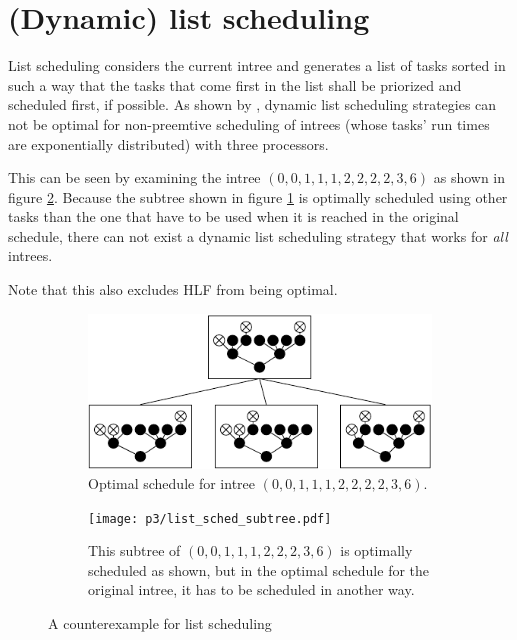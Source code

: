 \section{(Dynamic) list scheduling}
\label{sec:suboptimal-strategies-list-scheduling}

List scheduling considers the current intree and generates a list of tasks sorted in such a way that the tasks that come first in the list shall be priorized and scheduled first, if possible. As shown by \cite{MoritzMaasDiploma}, dynamic list scheduling strategies can not be optimal for non-preemtive scheduling of intrees (whose tasks' run times are exponentially distributed) with three processors.

This can be seen by examining the intree $(0,0,1,1,1,2,2,2,2,3,6)$ as shown in figure \ref{fig:list-scheduling-counter-example}. Because the subtree shown in figure \ref{fig:list-schedule-counter-example-subtree} is optimally scheduled using other tasks than the one that have to be used when it is reached in the original schedule, there can not exist a dynamic list scheduling strategy that works for \emph{all} intrees.

Note that this also excludes HLF from being optimal.

\begin{figure}[ht]
  \centering
  \begin{subfigure}[b]{.45\textwidth}
    \centering
    \includegraphics{p3/list_sched_0011122236_opt_sched.pdf}
    \caption{Optimal schedule for intree $(0,0,1,1,1,2,2,2,2,3,6)$.}
  \end{subfigure}
  \quad
  \begin{subfigure}[b]{.45\textwidth}
    \centering
    \vfill
    \texttt{[image: p3/list\_sched\_subtree.pdf]}
    \vfill
    \caption{This subtree of $(0,0,1,1,1,2,2,2,3,6)$ is optimally scheduled as shown, but in the optimal schedule for the original intree, it has to be scheduled in another way.}
    \label{fig:list-schedule-counter-example-subtree}
  \end{subfigure}
  \caption{A counterexample for list scheduling}
  \label{fig:list-scheduling-counter-example}
\end{figure}

